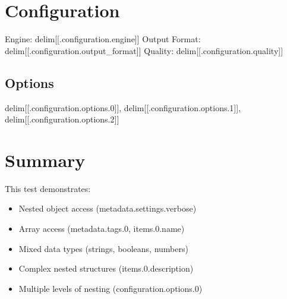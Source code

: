 \documentclass{article}
\begin{document}
\section{Configuration}
Engine: delim[[.configuration.engine]]
Output Format: delim[[.configuration.output_format]]
Quality: delim[[.configuration.quality]]

\subsection{Options}
delim[[.configuration.options.0]], delim[[.configuration.options.1]], delim[[.configuration.options.2]]

\section{Summary}
This test demonstrates:
\begin{itemize}
\item Nested object access (metadata.settings.verbose)
\item Array access (metadata.tags.0, items.0.name)
\item Mixed data types (strings, booleans, numbers)
\item Complex nested structures (items.0.description)
\item Multiple levels of nesting (configuration.options.0)
\end{itemize}
\end{document}
